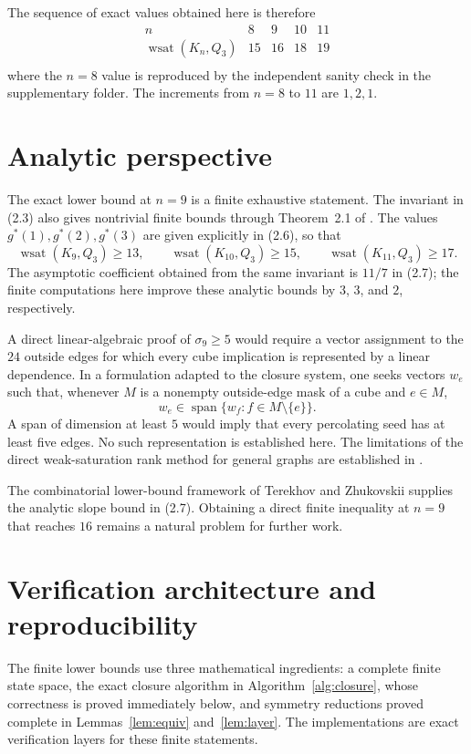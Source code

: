 \documentclass[11pt]{article}
\numberwithin{equation}{section}
\newcommand{\wsat}{\operatorname{wsat}}
\begin{document}
The sequence of exact values obtained here is therefore
\[
\begin{array}{c|cccc}
n&8&9&10&11\\ \hline
\wsat(K_n,Q_3)&15&16&18&19\\
\end{array}
\tag{7.3}
\]
where the $n=8$ value is reproduced by the independent sanity check in the supplementary folder. The increments from $n=8$ to $11$ are $1,2,1$.

\section{Analytic perspective}\label{sec:analytic}
The exact lower bound at $n=9$ is a finite exhaustive statement. The invariant in (2.3) also gives nontrivial finite bounds through Theorem~2.1 of \cite{TZ2025}. The values $g^*(1),g^*(2),g^*(3)$ are given explicitly in (2.6), so that
\[
\wsat(K_9,Q_3)\ge13,\qquad
\wsat(K_{10},Q_3)\ge15,\qquad
\wsat(K_{11},Q_3)\ge17.
\]
The asymptotic coefficient obtained from the same invariant is $11/7$ in (2.7); the finite computations here improve these analytic bounds by $3$, $3$, and $2$, respectively.

A direct linear-algebraic proof of $\sigma_9\ge5$ would require a vector assignment to the $24$ outside edges for which every cube implication is represented by a linear dependence. In a formulation adapted to the closure system, one seeks vectors $w_e$ such that, whenever $M$ is a nonempty outside-edge mask of a cube and $e\in M$,
\[
w_e\in\operatorname{span}\{w_f:f\in M\setminus\{e\}\}.
\]
A span of dimension at least $5$ would imply that every percolating seed has at least five edges. No such representation is established here. The limitations of the direct weak-saturation rank method for general graphs are established in \cite{TZrank2025}.

The combinatorial lower-bound framework of Terekhov and Zhukovskii supplies the analytic slope bound in (2.7). Obtaining a direct finite inequality at $n=9$ that reaches $16$ remains a natural problem for further work.

\section{Verification architecture and reproducibility}\label{sec:repro}
The finite lower bounds use three mathematical ingredients: a complete finite state space, the exact closure algorithm in Algorithm~\ref{alg:closure}, whose correctness is proved immediately below, and symmetry reductions proved complete in Lemmas~\ref{lem:equiv} and~\ref{lem:layer}. The implementations are exact verification layers for these finite statements.
\end{document}
